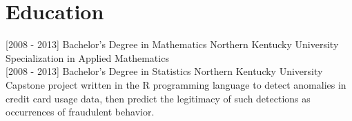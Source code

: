 \documentclass[]{moak-resume}
\begin{document}
\section{Education}
\begin{entrylist}
  \entry
    {[2008 - 2013]}
    {Bachelor's Degree in Mathematics}
    {Northern Kentucky University}
    {Specialization in Applied Mathematics\\}
  \entry
    {[2008 - 2013]}
    {Bachelor's Degree in Statistics}
    {Northern Kentucky University}
    {Capstone project written in the R programming language to detect anomalies in credit card usage data, then predict the legitimacy of such detections as occurrences of fraudulent behavior.\\}
\end{entrylist}
\\
\end{document}

